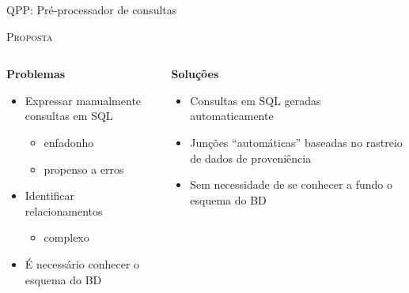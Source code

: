 \documentclass[12pt,compress]{beamer}
\newcommand{\todox}[2][]{\sethlcolor{yellow}\texthl{#1}\todo[author=\textbf{TODO},inline,color=yellow]{#2}}
\begin{document}
\begin{frame}[t]{QPP: Pré-processador de consultas}

\centerline{\large{\textsc{Proposta}}}

\begin{columns}[t]
    
\begin{column}{0.5\textwidth}

\centerline{\textbf{Problemas}}

\begin{itemize}
\item<1-> Expressar manualmente consultas em SQL
    \begin{itemize}
    \item enfadonho
    \item propenso a erros
    \end{itemize}
\item<2-> Identificar relacionamentos
    \begin{itemize}
    \item complexo
    \end{itemize}
\item<3-> É necessário conhecer o esquema do BD
\end{itemize}

\end{column}

\vrule{}

\begin{column}{0.5\textwidth}

\centerline{\textbf{Soluções}}

\begin{itemize}
    \item<1- | alert@1> Consultas em SQL geradas automaticamente
    \item<2- | alert@2> Junções ``automáticas'' baseadas no rastreio de dados de proveniência
    \item<3- | alert@3> Sem necessidade de se conhecer a fundo o esquema do BD
\end{itemize}

\end{column}

\end{columns}

\end{frame}

\end{document}
